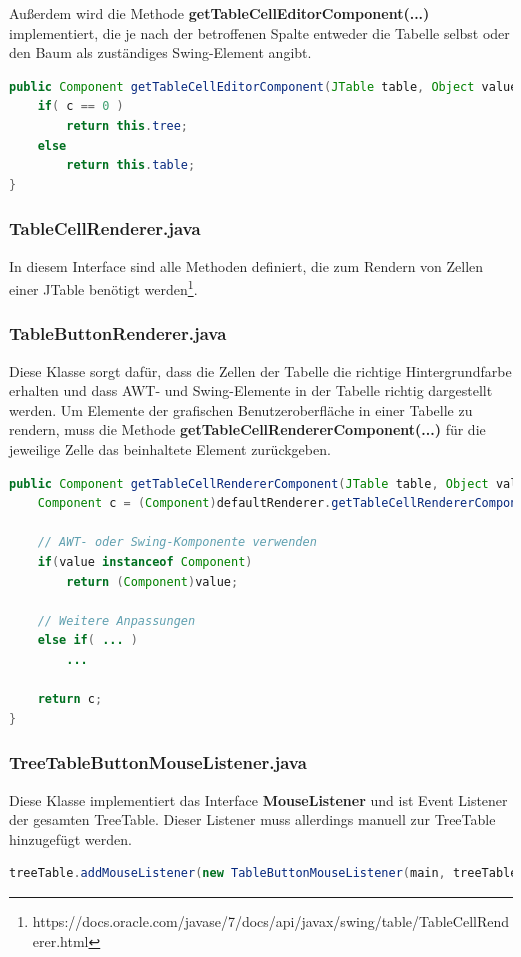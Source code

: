 Außerdem wird die Methode \textbf{getTableCellEditorComponent(...)} implementiert, die je nach der betroffenen Spalte entweder die Tabelle selbst oder den Baum als zuständiges Swing-Element angibt.
\begin{lstlisting}[language=JAVA]
public Component getTableCellEditorComponent(JTable table, Object value, boolean isSelected, int r, int c) {
    if( c == 0 )
        return this.tree;
    else
        return this.table;
}
\end{lstlisting}

\subsubsection*{TableCellRenderer.java}
In diesem Interface sind alle Methoden definiert, die zum Rendern von Zellen einer JTable benötigt werden\footnote{https://docs.oracle.com/javase/7/docs/api/javax/swing/table/TableCellRenderer.html}.

\subsubsection*{TableButtonRenderer.java}
Diese Klasse sorgt dafür, dass die Zellen der Tabelle die richtige Hintergrundfarbe erhalten und dass AWT- und Swing-Elemente in der Tabelle richtig dargestellt werden. Um Elemente der grafischen Benutzeroberfläche in einer Tabelle zu rendern, muss die Methode \textbf{getTableCellRendererComponent(...)} für die jeweilige Zelle das beinhaltete Element zurückgeben.
\begin{lstlisting}[language=JAVA]
public Component getTableCellRendererComponent(JTable table, Object value, boolean isSelected, boolean hasFocus, int row, int column) {
	Component c = (Component)defaultRenderer.getTableCellRendererComponent(table, value, isSelected, hasFocus, row, column);
	
	// AWT- oder Swing-Komponente verwenden
	if(value instanceof Component)
		return (Component)value;
	
	// Weitere Anpassungen
	else if( ... )
		...
	
	return c;
}
\end{lstlisting}

\subsubsection*{TreeTableButtonMouseListener.java}
Diese Klasse implementiert das Interface \textbf{MouseListener} und ist Event Listener der gesamten TreeTable. Dieser Listener muss allerdings manuell zur TreeTable hinzugefügt werden.
\begin{lstlisting}[language=JAVA]
treeTable.addMouseListener(new TableButtonMouseListener(main, treeTable));
\end{lstlisting}

